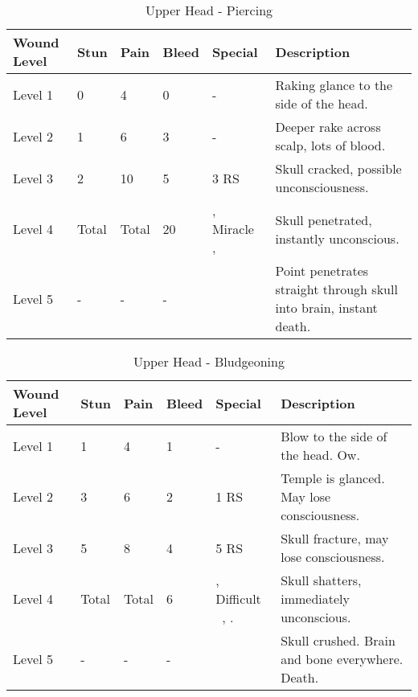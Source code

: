 \documentclass[oneside,11pt,english]{book}
\begin{document}
\begin{table}[hb] %
	\caption{Upper Head - Piercing}
	\label{wound:Upper Head - Piercing}
	\begin{tabu} to 
Wound Level &Stun &Pain &Bleed &Special &Description\\\toprule
Level 1 &0 &4 &0 &- &Raking glance to the side of the head. \\
Level 2 &1 &6 &3 &- &Deeper rake across scalp, lots of blood.\\
Level 3 &2 &10 &5 & 3 RS &Skull cracked, possible unconsciousness. \\
Level 4 &Total &Total &20
	&,\newline
	Miracle~ ,\newline
&Skull penetrated, instantly unconscious.\\
Level 5 &- &- &- & &Point penetrates straight through skull into brain, instant death.\\
	\end{tabu}
\end{table}

\begin{table}[hb] %
	\caption{Upper Head - Bludgeoning}
	\label{wound:Upper Head - Bludgeoning}
	\begin{tabu} to 
Wound Level &Stun &Pain &Bleed &Special &Description\\\toprule
Level 1& 1& 4& 1& - &Blow to the side of the head. Ow.\\
Level 2& 3& 6& 2&  1 RS &Temple is glanced. May lose consciousness.\\
Level 3& 5& 8& 4&  5 RS &Skull fracture, may lose consciousness.\\
Level 4& Total &Total &6 
	&,\newline
	Difficult ~,\newline
	.
&Skull shatters, immediately unconscious.\\
Level 5& - &- &- & &Skull crushed. Brain and bone everywhere. Death. \\
	\end{tabu}
\end{table}
\end{document}
